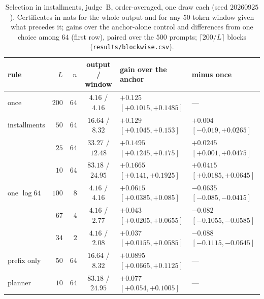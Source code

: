 \begin{table}[ht]
\centering\footnotesize
\caption{Selection in installments, judge~B, order-averaged, one draw each (seed $20260925$). Certificates
in nats for the whole output and for any $50$-token window given what precedes it; gains over the
anchor-alone control and differences from one choice among $64$ (first row), paired over the $500$
prompts; $\lceil 200/L\rceil$ blocks (\texttt{results/\allowbreak blockwise.csv}).}\label{tab:blockwise}
\setlength{\tabcolsep}{2.5pt}
\begin{tabular}{@{}lrrcll@{}}
\toprule
rule & $L$ & $n$ & output / window & gain over the anchor & minus once \\
\midrule
once & $200$ & $64$ & $4.16$ / $4.16$ & $+0.125$ $[+0.1015, +0.1485]$ & --- \\
installments & $50$ & $64$ & $16.64$ / $8.32$ & $+0.129$ $[+0.1045, +0.153]$ & $+0.004$ $[-0.019, +0.0265]$ \\
 & $25$ & $64$ & $33.27$ / $12.48$ & $+0.1495$ $[+0.1245, +0.175]$ & $+0.0245$ $[+0.001, +0.0475]$ \\
 & $10$ & $64$ & $83.18$ / $24.95$ & $+0.1665$ $[+0.141, +0.1925]$ & $+0.0415$ $[+0.0185, +0.0645]$ \\
one $\log 64$ & $100$ & $8$ & $4.16$ / $4.16$ & $+0.0615$ $[+0.0385, +0.085]$ & $-0.0635$ $[-0.085, -0.0415]$ \\
 & $67$ & $4$ & $4.16$ / $2.77$ & $+0.043$ $[+0.0205, +0.0655]$ & $-0.082$ $[-0.1055, -0.0585]$ \\
 & $34$ & $2$ & $4.16$ / $2.08$ & $+0.037$ $[+0.0155, +0.0585]$ & $-0.088$ $[-0.1115, -0.0645]$ \\
prefix only & $50$ & $64$ & $16.64$ / $8.32$ & $+0.0895$ $[+0.0665, +0.1125]$ & --- \\
planner & $10$ & $64$ & $83.18$ / $24.95$ & $+0.077$ $[+0.054, +0.1005]$ & --- \\
\bottomrule
\end{tabular}
\end{table}

